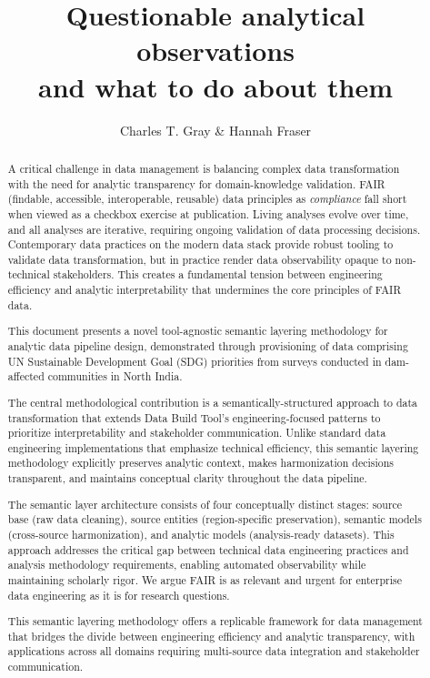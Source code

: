 \documentclass{article}
\title{Questionable analytical observations\\and what to do about them}
\author{Charles T. Gray \& Hannah Fraser}
\begin{document}
\maketitle



\begin{abstract}

A critical challenge in data management is balancing complex data transformation with the need for analytic transparency for domain-knowledge validation. FAIR (findable, accessible, interoperable, reusable) data principles as \textit{compliance} fall short when viewed as a checkbox exercise at publication. Living analyses evolve over time, and all analyses are iterative, requiring ongoing validation of data processing decisions. Contemporary data practices on the modern data stack provide robust tooling to validate data transformation, but in practice render data observability opaque to non-technical stakeholders. This creates a fundamental tension between engineering efficiency and analytic interpretability that undermines the core principles of FAIR data.

This document presents a novel tool-agnostic semantic layering methodology for analytic data pipeline design, demonstrated through provisioning of data comprising UN Sustainable Development Goal (SDG) priorities from surveys conducted in dam-affected communities in North India.

The central methodological contribution is a semantically-structured approach to data transformation that extends Data Build Tool's engineering-focused patterns to prioritize interpretability and stakeholder communication. Unlike standard data engineering implementations that emphasize technical efficiency, this semantic layering methodology explicitly preserves analytic context, makes harmonization decisions transparent, and maintains conceptual clarity throughout the data pipeline.

The semantic layer architecture consists of four conceptually distinct stages: source base (raw data cleaning), source entities (region-specific preservation), semantic models (cross-source harmonization), and analytic models (analysis-ready datasets). This approach addresses the critical gap between technical data engineering practices and analysis methodology requirements, enabling automated observability while maintaining scholarly rigor. We argue FAIR is as relevant and urgent for enterprise data engineering as it is for research questions.

This semantic layering methodology offers a replicable framework for data management that bridges the divide between engineering efficiency and analytic transparency, with applications across all domains requiring multi-source data integration and stakeholder communication.

\end{abstract}
\end{document}
